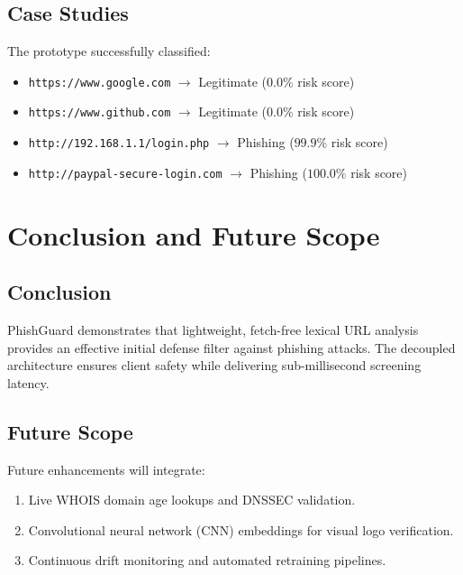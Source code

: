 \documentclass[12pt,a4paper]{report}
\begin{document}
\section{Case Studies}
The prototype successfully classified:
\begin{itemize}
    \item \texttt{https://www.google.com} $\rightarrow$ Legitimate ($0.0\%$ risk score)
    \item \texttt{https://www.github.com} $\rightarrow$ Legitimate ($0.0\%$ risk score)
    \item \texttt{http://192.168.1.1/login.php} $\rightarrow$ Phishing ($99.9\%$ risk score)
    \item \texttt{http://paypal-secure-login.com} $\rightarrow$ Phishing ($100.0\%$ risk score)
\end{itemize}

\chapter{Conclusion and Future Scope}
\section{Conclusion}
PhishGuard demonstrates that lightweight, fetch-free lexical URL analysis provides an effective initial defense filter against phishing attacks. The decoupled architecture ensures client safety while delivering sub-millisecond screening latency.

\section{Future Scope}
Future enhancements will integrate:
\begin{enumerate}
    \item Live WHOIS domain age lookups and DNSSEC validation.
    \item Convolutional neural network (CNN) embeddings for visual logo verification.
    \item Continuous drift monitoring and automated retraining pipelines.
\end{enumerate}
\end{document}

